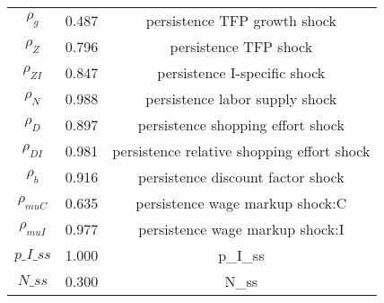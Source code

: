 \begin{center}
\begin{longtable}{ccc}
${\rho_g}$ 	 & 	 0.487 	 & 	 persistence TFP growth shock\\
${\rho_Z}$ 	 & 	 0.796 	 & 	 persistence TFP shock\\
${\rho_{ZI}}$ 	 & 	 0.847 	 & 	 persistence I-specific shock\\
${\rho_N}$ 	 & 	 0.988 	 & 	 persistence labor supply shock\\
${\rho_D}$ 	 & 	 0.897 	 & 	 persistence shopping effort shock\\
${\rho_{DI}}$ 	 & 	 0.981 	 & 	 persistence relative shopping effort shock\\
${\rho_b}$ 	 & 	 0.916 	 & 	 persistence discount factor shock\\
${\rho_{muC}}$ 	 & 	 0.635 	 & 	 persistence wage markup shock:C\\
${\rho_{muI}}$ 	 & 	 0.977 	 & 	 persistence wage markup shock:I\\
$p\_I\_ss$ 	 & 	 1.000 	 & 	 p\_I\_ss\\
$N\_ss$ 	 & 	 0.300 	 & 	 N\_ss\\
\bottomrule%
\end{longtable}
\end{center}
